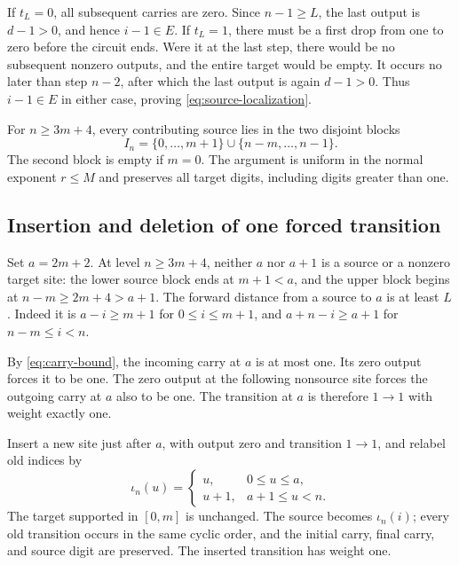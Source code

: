 If $t_L=0$, all subsequent carries are zero. Since $n-1\ge L$,
the last output is $d-1>0$, and hence $i-1\in E$. If $t_L=1$,
there must be a first drop from one to zero before the circuit
ends. Were it at the last step, there would be no subsequent
nonzero outputs, and the entire target would be empty. It occurs
no later than step $n-2$, after which the last output is again
$d-1>0$. Thus $i-1\in E$ in either case, proving
\eqref{eq:source-localization}.

For $n\ge3m+4$, every contributing source lies in the two
disjoint blocks
\begin{equation}
 I_n=\{0,\ldots,m+1\}\cup\{n-m,\ldots,n-1\}.
 \label{eq:source-blocks}
\end{equation}
The second block is empty if $m=0$. The argument is uniform in
the normal exponent $r\le M$ and preserves all target digits,
including digits greater than one.

\subsection{Insertion and deletion of one forced transition}

Set $a=2m+2$. At level $n\ge3m+4$, neither $a$ nor $a+1$
is a source or a nonzero target site: the lower source block ends
at $m+1<a$, and the upper block begins at $n-m\ge2m+4>a+1$.
The forward distance from a source to $a$ is at least $L$.
Indeed it is $a-i\ge m+1$ for $0\le i\le m+1$, and
$a+n-i\ge a+1$ for $n-m\le i<n$.

By \eqref{eq:carry-bound}, the incoming carry at $a$ is at most
one. Its zero output forces it to be one. The zero output at the
following nonsource site forces the outgoing carry at $a$ also
to be one. The transition at $a$ is therefore $1\to1$ with
weight exactly one.

Insert a new site just after $a$, with output zero and transition
$1\to1$, and relabel old indices by
\begin{equation}
 \iota_n(u)=
 \begin{cases}u,&0\le u\le a,\\u+1,&a+1\le u<n.
 \end{cases}
 \label{eq:ordinary-insertion}
\end{equation}
The target supported in $[0,m]$ is unchanged. The source becomes
$\iota_n(i)$; every old transition occurs in the same cyclic
order, and the initial carry, final carry, and source digit are
preserved. The inserted transition has weight one.

